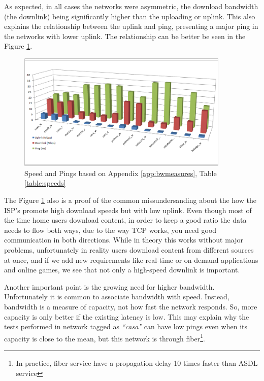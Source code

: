 As expected, in all cases the networks were asymmetric, 
the download bandwidth (the downlink) being significantly higher than the uploading
or uplink. This also explains the relationship between the uplink and ping,
presenting a major ping in the networks with lower uplink. The relationship
can be better be seen in the Figure \ref{fig:speeds}.

\begin{figure}[ht]
\centering
    \includegraphics[width=0.9\textwidth]{img/speed_graph}
\caption{Speed and Pings based on Appendix \ref{app:bwmeasures}, Table \ref{table:speeds}}
\label{fig:speeds}
\end{figure}%

The Figure \ref{fig:speeds} also is a proof of the common missundersanding
about the how the ISP's promote high download speeds but with low uplink. Even
though most of the time home users download content, in order to keep a good
ratio the data needs to flow both ways, due to the way TCP
works, you need good communication in both directions. While in theory this
works without major problems, unfortunately in reality users download content
from different sources at once, and if we add new requirements like real-time  or on-demand applications and online games, we see that not only a
high-speed downlink is important.

Another important point is the growing need for higher bandwidth.
Unfortunately it is common to associate bandwidth with speed. Instead,
bandwidth is a measure of capacity, not how fast the network responds. So,
more capacity is only better if the existing latency is low. This may
explain why the tests performed in network tagged as \emph{``casa''} can have low pings
even when its capacity is close to the mean, but this network is through
fiber\footnote{In practice, fiber service have a propagation delay 10 times
faster than ASDL service}.

